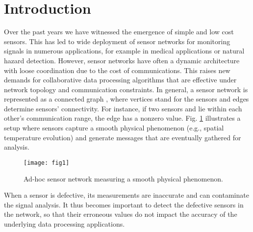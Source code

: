 \documentclass[journal]{IEEEtran}
\begin{document}
\section{Introduction}\label{sec:intro}
Over the past years we have witnessed the emergence of simple and low cost sensors. This has led to wide deployment of sensor networks for monitoring 
signals in numerous applications, for example in medical applications or natural hazard detection. However, sensor networks have often a dynamic architecture with loose coordination due to the cost of communications. This raises new demands for collaborative data processing algorithms that are effective under network topology and communication constraints. In general, a sensor network is represented as a connected graph , where vertices  stand for the  sensors and edges  determine sensors' connectivity. For instance, if two sensors  and  lie within each other's communication range, the edge  has a nonzero value.    
 Fig. \ref{fig:illus} illustrates a setup where sensors capture a smooth physical phenomenon (e.g., spatial temperature evolution) and generate messages that are eventually gathered for analysis. 
\begin{figure}[h!]
\begin{center}
\texttt{[image: fig1]}
\end{center}
\caption{\label{fig:illus}Ad-hoc sensor network measuring a smooth physical phenomenon.}
\end{figure}
When a sensor is defective, its measurements are inaccurate and can contaminate the signal analysis. It thus becomes important to detect the defective sensors in the network, so that their erroneous values do not impact the accuracy of the underlying data processing applications. 
\end{document}
